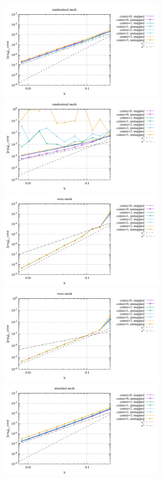 \begin{center}
\includegraphics[width=8cm]{python_codes/fieldstone_76/results/bench3/curved/errors_V_mt2.pdf}
\includegraphics[width=8cm]{python_codes/fieldstone_76/results/bench3/curved/errors_P_mt2.pdf}\\
\includegraphics[width=8cm]{python_codes/fieldstone_76/results/bench3/curved/errors_V_mt3.pdf}
\includegraphics[width=8cm]{python_codes/fieldstone_76/results/bench3/curved/errors_P_mt3.pdf}\\
\includegraphics[width=8cm]{python_codes/fieldstone_76/results/bench3/curved/errors_V_mt4.pdf}

\end{center}
